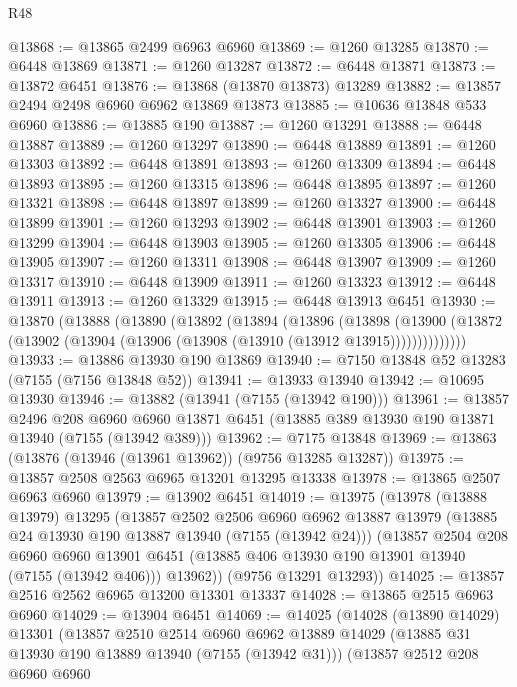 \begin{lexlean}{R48}
\begin{coremodule}
@13868 := @13865 @2499 @6963 @6960
@13869 := @1260 @13285
@13870 := @6448 @13869
@13871 := @1260 @13287
@13872 := @6448 @13871
@13873 := @13872 @6451
@13876 := @13868 (@13870 @13873) @13289
@13882 := @13857 @2494 @2498 @6960 @6962 @13869 @13873
@13885 := @10636 @13848 @533 @6960
@13886 := @13885 @190
@13887 := @1260 @13291
@13888 := @6448 @13887
@13889 := @1260 @13297
@13890 := @6448 @13889
@13891 := @1260 @13303
@13892 := @6448 @13891
@13893 := @1260 @13309
@13894 := @6448 @13893
@13895 := @1260 @13315
@13896 := @6448 @13895
@13897 := @1260 @13321
@13898 := @6448 @13897
@13899 := @1260 @13327
@13900 := @6448 @13899
@13901 := @1260 @13293
@13902 := @6448 @13901
@13903 := @1260 @13299
@13904 := @6448 @13903
@13905 := @1260 @13305
@13906 := @6448 @13905
@13907 := @1260 @13311
@13908 := @6448 @13907
@13909 := @1260 @13317
@13910 := @6448 @13909
@13911 := @1260 @13323
@13912 := @6448 @13911
@13913 := @1260 @13329
@13915 := @6448 @13913 @6451
@13930 := @13870
    (@13888
      (@13890
        (@13892
          (@13894
            (@13896
              (@13898
                (@13900 (@13872 (@13902 (@13904 (@13906 (@13908 (@13910 (@13912 @13915))))))))))))))
@13933 := @13886 @13930 @190 @13869
@13940 := @7150 @13848 @52 @13283 (@7155 (@7156 @13848 @52))
@13941 := @13933 @13940
@13942 := @10695 @13930
@13946 := @13882 (@13941 (@7155 (@13942 @190)))
@13961 := @13857
    @2496
    @208
    @6960
    @6960
    @13871
    @6451
    (@13885 @389 @13930 @190 @13871 @13940 (@7155 (@13942 @389)))
@13962 := @7175 @13848
@13969 := @13863 (@13876 (@13946 (@13961 @13962)) (@9756 @13285 @13287))
@13975 := @13857 @2508 @2563 @6965 @13201 @13295 @13338
@13978 := @13865 @2507 @6963 @6960
@13979 := @13902 @6451
@14019 := @13975
    (@13978
      (@13888 @13979)
      @13295
      (@13857
        @2502
        @2506
        @6960
        @6962
        @13887
        @13979
        (@13885 @24 @13930 @190 @13887 @13940 (@7155 (@13942 @24)))
        (@13857
          @2504
          @208
          @6960
          @6960
          @13901
          @6451
          (@13885 @406 @13930 @190 @13901 @13940 (@7155 (@13942 @406)))
          @13962))
      (@9756 @13291 @13293))
@14025 := @13857 @2516 @2562 @6965 @13200 @13301 @13337
@14028 := @13865 @2515 @6963 @6960
@14029 := @13904 @6451
@14069 := @14025
    (@14028
      (@13890 @14029)
      @13301
      (@13857
        @2510
        @2514
        @6960
        @6962
        @13889
        @14029
        (@13885 @31 @13930 @190 @13889 @13940 (@7155 (@13942 @31)))
        (@13857
          @2512
          @208
          @6960
          @6960

\end{coremodule}
\end{lexlean}
